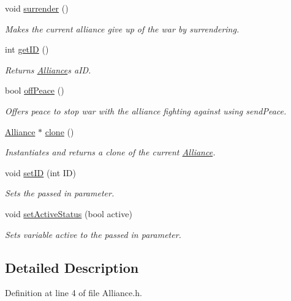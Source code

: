 \begin{DoxyCompactItemize}
void \hyperlink{classAlliance_ad3b8272ccec63d3a32b7e241434948e9}{surrender} ()
\begin{DoxyCompactList}\small\item\em Makes the current alliance give up of the war by surrendering. \end{DoxyCompactList}\item 
int \hyperlink{classAlliance_a7f23330454f02b0056eb92bd2072359d}{get\+ID} ()
\begin{DoxyCompactList}\small\item\em Returns \hyperlink{classAlliance}{Alliance}\textquotesingle{}s a\+ID. \end{DoxyCompactList}\item 
bool \hyperlink{classAlliance_aa774a70192e6d4fd034cc7689b3ff5a8}{off\+Peace} ()
\begin{DoxyCompactList}\small\item\em Offers peace to stop war with the alliance fighting against using send\+Peace. \end{DoxyCompactList}\item 
\hyperlink{classAlliance}{Alliance} $\ast$ \hyperlink{classAlliance_adc67a41223565105889493f9cfd350d0}{clone} ()
\begin{DoxyCompactList}\small\item\em Instantiates and returns a clone of the current \hyperlink{classAlliance}{Alliance}. \end{DoxyCompactList}\item 
void \hyperlink{classAlliance_ace044c4ae0ede7f19990279f163b6f37}{set\+ID} (int ID)
\begin{DoxyCompactList}\small\item\em Sets the passed in parameter. \end{DoxyCompactList}\item 
void \hyperlink{classAlliance_a21492fd899af1441c9d8ddf11a558e7d}{set\+Active\+Status} (bool active)
\begin{DoxyCompactList}\small\item\em Sets variable active to the passed in parameter. \end{DoxyCompactList}\end{DoxyCompactItemize}


\subsection{Detailed Description}


Definition at line 4 of file Alliance.\+h.



